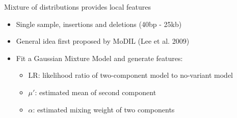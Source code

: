 \documentclass{beamer}
\begin{document}
\begin{frame}{Mixture of distributions provides local features}
\begin{center}
  \end{center}
\begin{itemize}
\item Single sample, insertions and deletions (40bp - 25kb)
\item General idea first proposed by MoDIL (Lee et al. 2009)
\item Fit a Gaussian Mixture Model and generate features:
\begin{itemize}
 \item LR: likelihood ratio of two-component model to no-variant model
 \item $\mu'$: estimated mean of second component
 \item $\alpha$: estimated mixing weight of two components
\end{itemize}
\end{itemize}
\end{frame}


\end{document}

